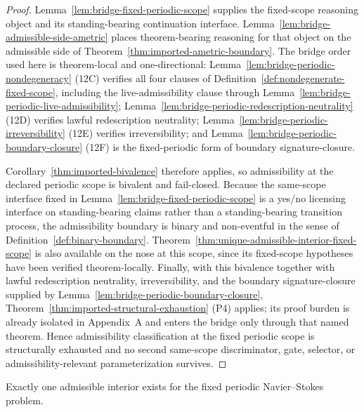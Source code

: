 \begin{proof}
Lemma~\ref{lem:bridge-fixed-periodic-scope} supplies the fixed-scope reasoning object and its standing-bearing continuation interface. Lemma~\ref{lem:bridge-admissible-side-ametric} places theorem-bearing reasoning for that object on the admissible side of Theorem~\ref{thm:imported-ametric-boundary}. The bridge order used here is theorem-local and one-directional: Lemma~\ref{lem:bridge-periodic-nondegeneracy} (12C) verifies all four clauses of Definition~\ref{def:nondegenerate-fixed-scope}, including the live-admissibility clause through Lemma~\ref{lem:bridge-periodic-live-admissibility}; Lemma~\ref{lem:bridge-periodic-redescription-neutrality} (12D) verifies lawful redescription neutrality; Lemma~\ref{lem:bridge-periodic-irreversibility} (12E) verifies irreversibility; and Lemma~\ref{lem:bridge-periodic-boundary-closure} (12F) is the fixed-periodic form of boundary signature-closure.

Corollary~\ref{thm:imported-bivalence} therefore applies, so admissibility at the declared periodic scope is bivalent and fail-closed. Because the same-scope interface fixed in Lemma~\ref{lem:bridge-fixed-periodic-scope} is a yes/no licensing interface on standing-bearing claims rather than a standing-bearing transition process, the admissibility boundary is binary and non-eventful in the sense of Definition~\ref{def:binary-boundary}. Theorem~\ref{thm:unique-admissible-interior-fixed-scope} is also available on the nose at this scope, since its fixed-scope hypotheses have been verified theorem-locally. Finally, with this bivalence together with lawful redescription neutrality, irreversibility, and the boundary signature-closure supplied by Lemma~\ref{lem:bridge-periodic-boundary-closure}, Theorem~\ref{thm:imported-structural-exhaustion} (P4) applies; its proof burden is already isolated in Appendix~A and enters the bridge only through that named theorem. Hence admissibility classification at the fixed periodic scope is structurally exhausted and no second same-scope discriminator, gate, selector, or admissibility-relevant parameterization survives.
\end{proof}

\begin{manualcorollary}
\label{cor:periodic-unique-admissible-interior}
Exactly one admissible interior exists for the fixed periodic Navier--Stokes problem.
\end{manualcorollary}

